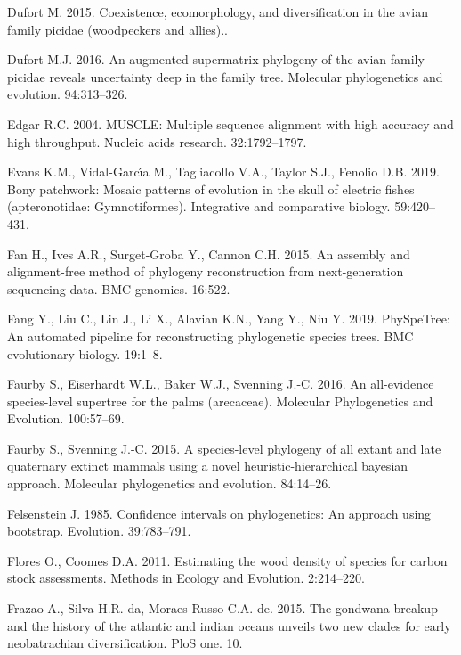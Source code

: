 \documentclass[]{article}
\begin{document}
\leavevmode\hypertarget{ref-dufort2015coexistence}{}%
Dufort M. 2015. Coexistence, ecomorphology, and diversification in the avian family picidae (woodpeckers and allies)..

\leavevmode\hypertarget{ref-dufort2016augmented}{}%
Dufort M.J. 2016. An augmented supermatrix phylogeny of the avian family picidae reveals uncertainty deep in the family tree. Molecular phylogenetics and evolution. 94:313--326.

\leavevmode\hypertarget{ref-edgar2004muscle}{}%
Edgar R.C. 2004. MUSCLE: Multiple sequence alignment with high accuracy and high throughput. Nucleic acids research. 32:1792--1797.

\leavevmode\hypertarget{ref-evans2019bony}{}%
Evans K.M., Vidal-Garcı́a M., Tagliacollo V.A., Taylor S.J., Fenolio D.B. 2019. Bony patchwork: Mosaic patterns of evolution in the skull of electric fishes (apteronotidae: Gymnotiformes). Integrative and comparative biology. 59:420--431.

\leavevmode\hypertarget{ref-fan2015assembly}{}%
Fan H., Ives A.R., Surget-Groba Y., Cannon C.H. 2015. An assembly and alignment-free method of phylogeny reconstruction from next-generation sequencing data. BMC genomics. 16:522.

\leavevmode\hypertarget{ref-fang2019physpetree}{}%
Fang Y., Liu C., Lin J., Li X., Alavian K.N., Yang Y., Niu Y. 2019. PhySpeTree: An automated pipeline for reconstructing phylogenetic species trees. BMC evolutionary biology. 19:1--8.

\leavevmode\hypertarget{ref-faurby2016all}{}%
Faurby S., Eiserhardt W.L., Baker W.J., Svenning J.-C. 2016. An all-evidence species-level supertree for the palms (arecaceae). Molecular Phylogenetics and Evolution. 100:57--69.

\leavevmode\hypertarget{ref-faurby2015species}{}%
Faurby S., Svenning J.-C. 2015. A species-level phylogeny of all extant and late quaternary extinct mammals using a novel heuristic-hierarchical bayesian approach. Molecular phylogenetics and evolution. 84:14--26.

\leavevmode\hypertarget{ref-felsenstein1985confidence}{}%
Felsenstein J. 1985. Confidence intervals on phylogenetics: An approach using bootstrap. Evolution. 39:783--791.

\leavevmode\hypertarget{ref-flores2011estimating}{}%
Flores O., Coomes D.A. 2011. Estimating the wood density of species for carbon stock assessments. Methods in Ecology and Evolution. 2:214--220.

\leavevmode\hypertarget{ref-frazao2015gondwana}{}%
Frazao A., Silva H.R. da, Moraes Russo C.A. de. 2015. The gondwana breakup and the history of the atlantic and indian oceans unveils two new clades for early neobatrachian diversification. PloS one. 10.
\end{document}

